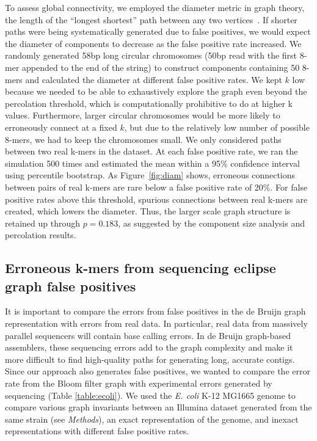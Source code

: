 \documentclass{pnastwo}
\begin{document}
\begin{article}
To assess global connectivity, we employed the diameter metric in
graph theory, the length of the ``longest shortest'' path between any
two vertices~\cite{bondy2008graph}.  If shorter paths were being
systematically generated due to false positives, we would expect the
diameter of components to decrease as the false positive rate
increased.  We randomly generated 58bp long circular chromosomes (50bp
read with the first 8-mer appended to the end of the string) to
construct components containing 50 8-mers and calculated the diameter
at different false positive rates. We kept $k$ low because we needed
to be able to exhaustively explore the graph even beyond the
percolation threshold, which is computationally prohibitive to do at
higher k values. Furthermore, larger circular chromosomes would be
more likely to erroneously connect at a fixed $k$, but due to the
relatively low number of possible 8-mers, we had to keep the
chromosomes small.  We only considered paths between two real k-mers
in the dataset.  At each false positive rate, we ran the simulation
500 times and estimated the mean within a 95\% confidence interval
using percentile bootstrap. As Figure~\ref{fig:diam} shows, erroneous
connections between pairs of real k-mers are rare below a false
positive rate of 20\%.  For false positive rates above this threshold,
spurious connections between real k-mers are created, which lowers the
diameter.  Thus, the larger scale graph structure is retained up
through $p = 0.183$, as suggested by the component size analysis and
percolation results.

\subsection{Erroneous k-mers from sequencing eclipse graph false positives}

It is important to compare the errors from false positives in the de
Bruijn graph representation with errors from real data.  In
particular, real data from massively parallel sequencers will contain
base calling errors.  In de Bruijn graph-based assemblers, these
sequencing errors add to the graph complexity and make it more
difficult to find high-quality paths for generating long, accurate
contigs. Since our approach also generates false positives, we wanted
to compare the error rate from the Bloom filter graph with
experimental errors generated by sequencing (Table
\ref{table:ecoli}). We used the \emph{E. coli} K-12 MG1665 genome to
compare various graph invariants between an Illumina dataset generated
from the same strain (see \emph{Methods}), an exact representation of
the genome, and inexact representations with different false positive
rates.


\end{article}
\end{document}

